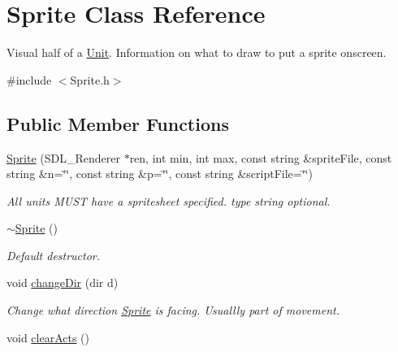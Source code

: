 \hypertarget{class_sprite}{}\section{Sprite Class Reference}
\label{class_sprite}


Visual half of a \hyperlink{class_unit}{Unit}. Information on what to draw to put a sprite onscreen.  




{\ttfamily \#include $<$Sprite.\+h$>$}

\subsection*{Public Member Functions}
\begin{DoxyCompactItemize}
\item 
\hyperlink{class_sprite_af4c8022f3f3e17a232691bb82e58b5a2}{Sprite} (S\+D\+L\+\_\+\+Renderer $\ast$ren, int min, int max, const string \&sprite\+File, const string \&n=\char`\"{}\char`\"{}, const string \&p=\char`\"{}\char`\"{}, const string \&script\+File=\char`\"{}\char`\"{})\hypertarget{class_sprite_af4c8022f3f3e17a232691bb82e58b5a2}{}\label{class_sprite_af4c8022f3f3e17a232691bb82e58b5a2}

\begin{DoxyCompactList}\small\item\em All units M\+U\+ST have a spritesheet specified. type string optional. \end{DoxyCompactList}\item 
\hyperlink{class_sprite_a8accab430f9d90ae5117b57d67e32b84}{$\sim$\+Sprite} ()\hypertarget{class_sprite_a8accab430f9d90ae5117b57d67e32b84}{}\label{class_sprite_a8accab430f9d90ae5117b57d67e32b84}

\begin{DoxyCompactList}\small\item\em Default destructor. \end{DoxyCompactList}\item 
void \hyperlink{class_sprite_a3eadf6ba2634a886862b6e2d9ca93b17}{change\+Dir} (dir d)\hypertarget{class_sprite_a3eadf6ba2634a886862b6e2d9ca93b17}{}\label{class_sprite_a3eadf6ba2634a886862b6e2d9ca93b17}

\begin{DoxyCompactList}\small\item\em Change what direction \hyperlink{class_sprite}{Sprite} is facing. Usuallly part of movement. \end{DoxyCompactList}\item 
void \hyperlink{class_sprite_ad22d9f033c1414853cc3063ceae24598}{clear\+Acts} ()\hypertarget{class_sprite_ad22d9f033c1414853cc3063ceae24598}{}\label{class_sprite_ad22d9f033c1414853cc3063ceae24598}


\end{DoxyCompactItemize}
